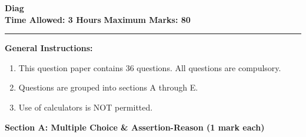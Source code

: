 \documentclass[12pt,a4paper]{exam}
\begin{document}
\thispagestyle{empty}
\begin{center}
  \textbf{\LARGE Diag} \\[0.3cm]
  \textbf{Time Allowed: 3 Hours} \hfill \textbf{Maximum Marks: 80} \\[0.3cm]
  \rule{\textwidth}{0.5pt}
\end{center}

\vspace{0.3cm}

\noindent\textbf{General Instructions:}
\begin{enumerate}
  \item {\normalfont\normalcolor This question paper contains 36 questions. All questions are compulsory.}
  \item {\normalfont\normalcolor Questions are grouped into sections A through E.}
  \item {\normalfont\normalcolor Use of calculators is NOT permitted.}
\end{enumerate}
\bigskip
\noindent\textbf{\large Section A: Multiple Choice \& Assertion-Reason (1 mark each)}
\end{document}

